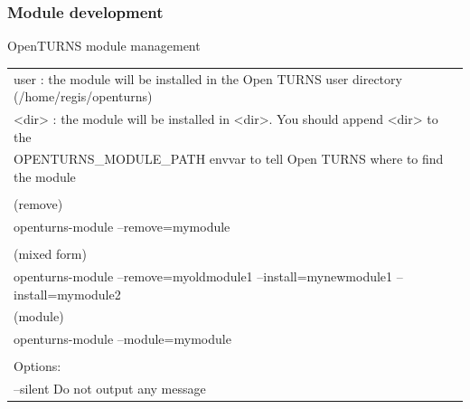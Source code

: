 \documentclass[8pt]{beamer}
\begin{document}
\begin{frame}
  \frametitle{Module development}
  \begin{block}{OpenTURNS module management}
    \scriptsize
    \begin{tabular}{l}
      \ttfamily * user : the module will be installed in the Open TURNS user directory (/home/regis/openturns) \\
      \ttfamily * <dir> : the module will be installed in <dir>. You should append <dir> to the \\
      \ttfamily OPENTURNS\_MODULE\_PATH envvar to tell Open TURNS where to find the module \\
      \\
      \ttfamily (remove) \\
      \ttfamily openturns-module --remove=mymodule \\
      \\
      \ttfamily (mixed form) \\
      \ttfamily openturns-module --remove=myoldmodule1 --install=mynewmodule1 --install=mymodule2 \\
      \ttfamily (module) \\
      \ttfamily openturns-module --module=mymodule \\
      \\
      \ttfamily Options: \\
      \ttfamily --silent          Do not output any message \\
    \end{tabular}
  \end{block}
\end{frame}
\end{document}

